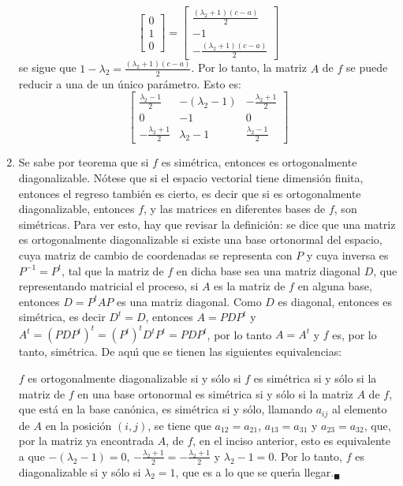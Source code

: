 \begin{solucion}
\begin{enumerate}[$a$)]
\begin{equation*}
\begin{bmatrix}
    0 \\ 1 \\ 0
   \end{bmatrix}
   =
   \begin{bmatrix}
    \frac{(\lambda_2 + 1)(c-a)}{2} \\
    -1 \\
    -\frac{(\lambda_2+1)(c-a)}{2}
   \end{bmatrix}
  \end{equation*}
  se sigue que $1-\lambda_2 = \frac{(\lambda_2 + 1)(c-a)}{2}$. 
  Por lo tanto, la matriz $A$ de $f$ se puede reducir a una de un \'unico par\'ametro. Esto es:
  \begin{equation*}
   \begin{bmatrix}
    \frac{\lambda_2 - 1}{2} & -( \lambda_2 - 1) & -\frac{\lambda_2+1}{2} \\
    0 & -1 & 0 \\
    -\frac{\lambda_2 + 1}{2} & \lambda_2 - 1 & \frac{\lambda_2 -1}{2}
   \end{bmatrix}
  \end{equation*}
  
  \item Se sabe por teorema que si $f$ es sim\'etrica, entonces es ortogonalmente diagonalizable. N\'otese que si el espacio vectorial tiene dimensi\'on finita, entonces el regreso tambi\'en es cierto, es decir que si es ortogonalmente diagonalizable, entonces $f$, y las matrices en diferentes bases de $f$, son sim\'etricas. Para ver esto, hay que revisar la definici\'on: se dice que una matriz es ortogonalmente diagonalizable si existe una base ortonormal del espacio, cuya matriz de cambio de coordenadas se representa con $P$ y cuya inversa es $P^{-1}=P^t$, tal que la matriz de $f$ en dicha base sea una matriz diagonal $D$, que representando matricial el proceso, si $A$ es la matriz de $f$ en alguna base, entonces $D=P^tAP$ es una matriz diagonal. Como $D$ es diagonal, entonces es sim\'etrica, es decir $D^t=D$, entonces $A = PDP^t$ y $A^t = (PDP^t)^t = (P^t)^tD^tP^t = PDP^t$, por lo tanto $A=A^t$ y $f$ es, por lo tanto, sim\'etrica. De aqu\'{\i} que se tienen las siguientes equivalencias:
  \par 
  $f$ es ortogonalmente diagonalizable si y s\'olo si $f$ es sim\'etrica si y s\'olo si la matriz de $f$ en una base ortonormal es sim\'etrica si y s\'olo si la matriz $A$ de $f$, que est\'a en la base can\'onica, es sim\'etrica si y s\'olo, llamando $a_{ij}$ al elemento de $A$ en la posici\'on $(i,j)$, se tiene que $a_{12} = a_{21}$, $a_{13} = a_{31}$ y $a_{23} = a_{32}$, que, por la matriz ya encontrada $A$, de $f$, en el inciso anterior, esto es equivalente a que $-(\lambda_2 - 1) = 0$, $-\frac{\lambda_2 + 1}{2} = -\frac{\lambda_2 + 1}{2}$ y $\lambda_2 -1 = 0$. Por lo tanto, $f$ es diagonalizable si y s\'olo si $\lambda_2 = 1$, que es a lo que se quer\'{\i}a llegar.${}_{\blacksquare}$
 \end{enumerate}
\end{solucion}
